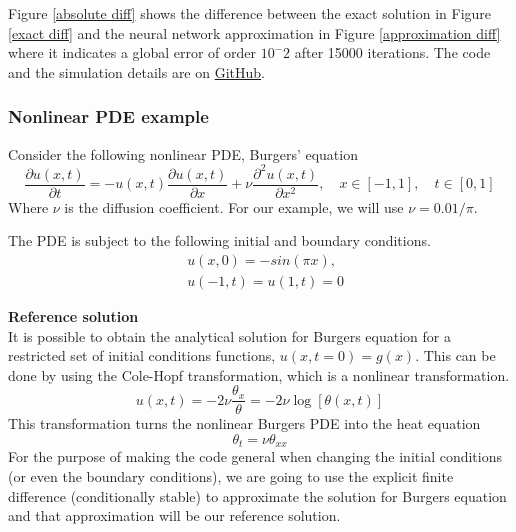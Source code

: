 \documentclass[a4paper, onecolumn, 12pt]{article}
\begin{document}
Figure \ref{absolute diff} shows the difference between the exact solution 
in Figure \ref{exact diff} and the neural network approximation in Figure \ref{approximation diff}
where it indicates a global error of order $10^-2$ after 15000 iterations. The code and the simulation
details are on \href{https://github.com/HashimAlSadah/MX-Project/blob/main/PINN/continuous_time_model/PDE_diffusion_PINN.ipynb}
{GitHub}.

\subsubsection{Nonlinear PDE example}
Consider the following nonlinear PDE, Burgers' equation
\begin{equation}
\frac{\partial u(x,t)}{\partial t} 
= -u(x,t)\frac{\partial u(x,t)}{\partial x} 
+ \nu \frac{\partial^2 u(x,t)}{\partial x^2}, \quad x \in [-1, 1], \quad t \in [0, 1]
\end{equation}
Where $\nu$ is the diffusion coefficient. For our example, we will use $\nu = 0.01 / \pi$.

The PDE is subject to the following initial and boundary conditions.
\begin{equation}
\begin{aligned}
&u(x, 0) = -sin(\pi x), \\
&u(-1, t) = u(1, t) = 0
\end{aligned}
\end{equation}

\textbf{Reference solution}\\
It is possible to obtain the analytical solution for Burgers equation for a 
restricted set of initial conditions functions, $u(x,t=0) = g(x)$. This can be done by 
using the Cole-Hopf transformation, which is a nonlinear transformation\cite{kutluay1999numerical}.
\begin{equation}
u(x, t) = -2 \nu \frac{\theta_x}{\theta} = -2 \nu \log[\theta(x,t)]
\end{equation}
This transformation turns the nonlinear Burgers PDE into the heat equation
\begin{equation}
\theta_t = \nu \theta_{xx}
\end{equation}
For the purpose of making the code general when changing the initial conditions (or even the boundary conditions), 
we are going to use the explicit finite difference (conditionally stable) to approximate the solution for 
Burgers equation and that approximation will be our reference solution.
\end{document}
